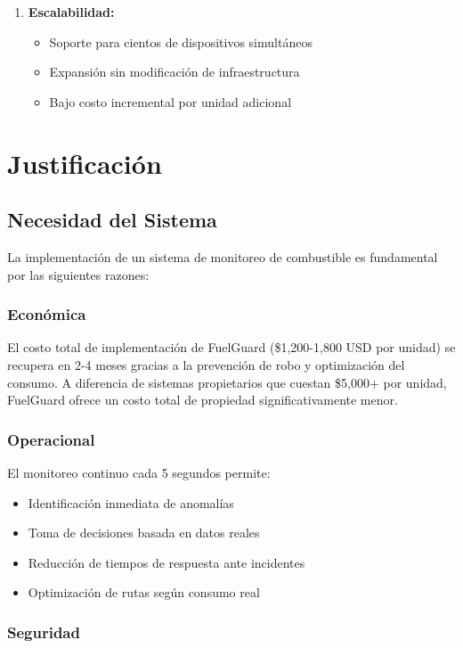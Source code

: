 \documentclass[12pt,a4paper,oneside]{report}
\begin{document}
\begin{enumerate}
    \item \textbf{Escalabilidad:}
    \begin{itemize}
        \item Soporte para cientos de dispositivos simultáneos
        \item Expansión sin modificación de infraestructura
        \item Bajo costo incremental por unidad adicional
    \end{itemize}
\end{enumerate}

\chapter{Justificación}

\section{Necesidad del Sistema}

La implementación de un sistema de monitoreo de combustible es fundamental por las siguientes razones:

\subsection{Económica}

El costo total de implementación de FuelGuard (\$1,200-1,800 USD por unidad) se recupera en 2-4 meses gracias a la prevención de robo y optimización del consumo. A diferencia de sistemas propietarios que cuestan \$5,000+ por unidad, FuelGuard ofrece un costo total de propiedad significativamente menor.

\subsection{Operacional}

El monitoreo continuo cada 5 segundos permite:

\begin{itemize}
    \item Identificación inmediata de anomalías
    \item Toma de decisiones basada en datos reales
    \item Reducción de tiempos de respuesta ante incidentes
    \item Optimización de rutas según consumo real
\end{itemize}

\subsection{Seguridad}
\end{document}
